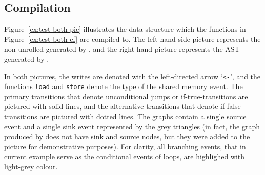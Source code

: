 \subsection{Compilation}
\label{ch:eval:show:compil}

Figure~\ref{ex:test-both-pic} illustrates the data structure which the functions in Figure~\ref{ex:test-both-cf} are compiled to.
The left-hand side picture represents the non-unrolled \xgraph[CF] generated by \porthos[2], and the right-hand picture represents the AST generated by \porthos[1].

In both pictures, the writes are denoted with the left-directed arrow `\lstinline{<-}', and the functions \lstinline{load} and \lstinline{store} denote the type of the shared memory event.
The primary transitions that denote unconditional jumps or if-true-transitions are pictured with solid lines, and the alternative transitions that denote if-false-transitions are pictured with dotted lines.
The graphs contain a single source event and a single sink event represented by the grey triangles (in fact, the graph produced by \porthos[1] does not have sink and source nodes, but they were added to the picture for demonstrative purposes).
For clarity, all branching events, that in current example serve as the conditional events of loops, are highlighed with light-grey colour.

